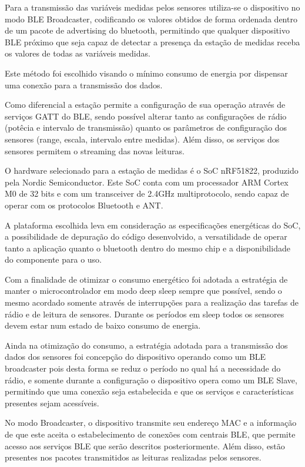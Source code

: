 Para a transmissão das variáveis medidas pelos sensores utiliza-se o dispositivo
no modo BLE Broadcaster, codificando os valores obtidos de forma ordenada dentro
de um pacote de advertising do bluetooth, permitindo que qualquer dispositivo
BLE próximo que seja capaz de detectar a presença da estação de medidas
receba os valores de todas as variáveis medidas.

Este método foi escolhido visando o mínimo consumo de energia por dispensar uma
conexão para a transmissão dos dados.
 
Como diferencial a estação permite a configuração de sua operação através de
serviços GATT do BLE, sendo possível alterar tanto as configurações de rádio
(potêcia e intervalo de transmissão) quanto os parâmetros de configuração dos
sensores (range, escala, intervalo entre medidas). Além disso, os serviços dos
sensores permitem o streaming das novas leituras.

O hardware selecionado para a estação de medidas é o SoC nRF51822, produzido
pela Nordic Semiconductor. Este SoC conta com um processador ARM Cortex M0 de 32
bits e com um transceiver de 2.4GHz multiprotocolo, sendo capaz de operar com
os protocolos Bluetooth e ANT.\cite{nRF51ProdSpec}

A plataforma escolhida leva em consideração as especificações energéticas do
SoC, a possibilidade de depuração do código desenvolvido, a versatilidade de
operar tanto a aplicação quanto o bluetooth dentro do mesmo chip e a
disponibilidade do componente para o uso.

Com a finalidade de otimizar o consumo energético foi adotada a estratégia de
manter o microcontrolador em modo deep sleep sempre que possível, sendo o mesmo
acordado somente através de interrupções para a realização das tarefas de rádio
e de leitura de sensores. Durante os períodos em sleep todos os sensores devem
estar num estado de baixo consumo de energia.\cite{MicrochipLPDesign}

Ainda na otimização do consumo, a estratégia adotada para a transmissão dos
dados dos sensores foi concepção do dispositivo operando como um BLE broadcaster
pois desta forma se reduz o período no qual há a necessidade do rádio, e
somente durante a configuração o dispositivo opera como um BLE Slave,
permitindo que uma conexão seja estabelecida e que os serviços e
características presentes sejam acessíveis.

No modo Broadcaster, o dispositivo transmite seu endereço MAC e a informação de
que este aceita o estabelecimento de conexões com centrais BLE, que permite
acesso aos serviços BLE que serão descritos posteriormente.
Além disso, estão presentes nos pacotes transmitidos as leituras realizadas
pelos sensores.

